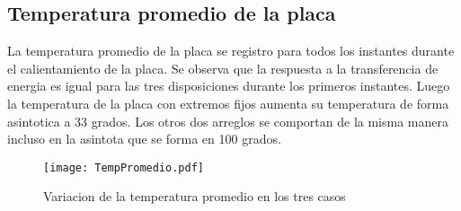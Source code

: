 \documentclass[12pt]{article}
\begin{document}
\subsection{Temperatura promedio de la placa}
La temperatura promedio de la placa se registro para todos los instantes durante el calientamiento de la placa. Se observa que la respuesta a la transferencia de energia es igual para las tres disposiciones durante los primeros instantes. Luego la temperatura de la placa con extremos fijos aumenta su temperatura de forma asintotica a 33 grados. Los otros dos arreglos se comportan de la misma manera incluso en la asintota que se forma en 100 grados.   
\begin{figure}[h!]
\centering
\texttt{[image: TempPromedio.pdf]}
\caption{Variacion de la temperatura promedio en los tres casos}
\label{Fig.}
\end{figure}
\end{document}
